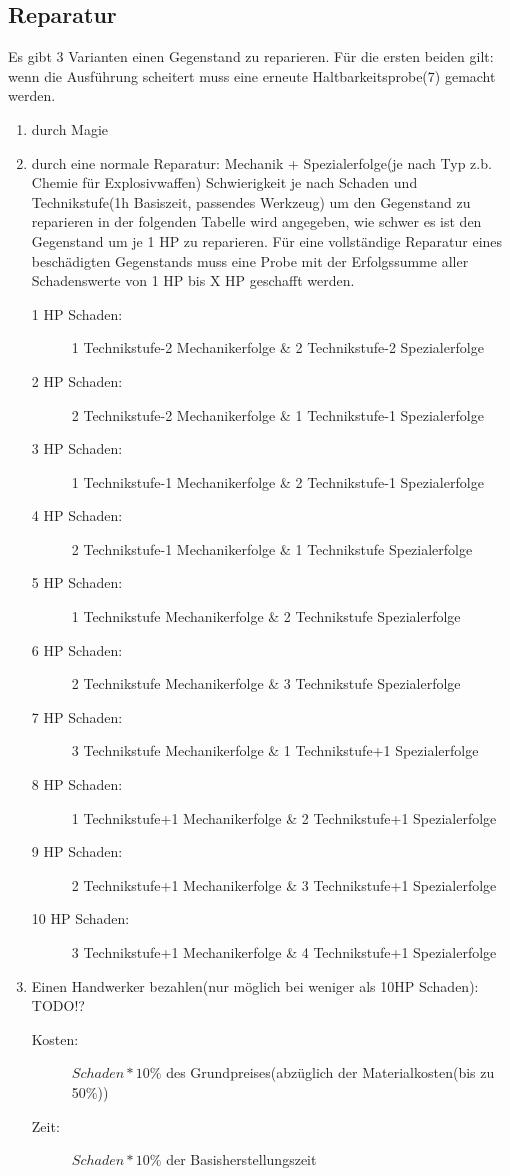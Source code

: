 \subsection{Reparatur}
Es gibt 3 Varianten einen Gegenstand zu reparieren. Für die ersten beiden gilt: wenn die Ausführung scheitert muss eine erneute Haltbarkeitsprobe(7) gemacht werden.\begin{enumerate}
\item durch Magie
\item \label{Reperatur} durch eine normale Reparatur: Mechanik + Spezialerfolge(je nach Typ z.b. Chemie für Explosivwaffen) Schwierigkeit je nach Schaden und Technikstufe(1h Basiszeit, passendes Werkzeug) um den Gegenstand zu reparieren in der folgenden Tabelle wird angegeben, wie schwer es ist den Gegenstand um je 1 HP zu reparieren. Für eine vollständige Reparatur eines beschädigten Gegenstands muss eine Probe mit der Erfolgssumme aller Schadenswerte von 1 HP bis X HP geschafft werden.

\begin{description}
\item[1 HP Schaden:] 1 Technikstufe-2 Mechanikerfolge \& 2 Technikstufe-2 Spezialerfolge
\item[2 HP Schaden:] 2 Technikstufe-2 Mechanikerfolge \& 1 Technikstufe-1 Spezialerfolge
\item[3 HP Schaden:] 1 Technikstufe-1 Mechanikerfolge \& 2 Technikstufe-1 Spezialerfolge
\item[4 HP Schaden:] 2 Technikstufe-1 Mechanikerfolge \& 1 Technikstufe Spezialerfolge
\item[5 HP Schaden:] 1 Technikstufe Mechanikerfolge \& 2 Technikstufe Spezialerfolge
\item[6 HP Schaden:] 2 Technikstufe Mechanikerfolge \& 3 Technikstufe Spezialerfolge
\item[7 HP Schaden:] 3 Technikstufe Mechanikerfolge \& 1 Technikstufe+1 Spezialerfolge
\item[8 HP Schaden:] 1 Technikstufe+1 Mechanikerfolge \& 2 Technikstufe+1 Spezialerfolge
\item[9 HP Schaden:] 2 Technikstufe+1 Mechanikerfolge \& 3 Technikstufe+1 Spezialerfolge
\item[10 HP Schaden:] 3 Technikstufe+1 Mechanikerfolge \& 4 Technikstufe+1 Spezialerfolge
\end{description}
\item Einen Handwerker bezahlen(nur möglich bei weniger als 10HP Schaden): TODO!?
\begin{description}
\item[Kosten:] $Schaden*10\%$ des Grundpreises(abzüglich der Materialkosten(bis zu 50\%))
\item[Zeit:] $Schaden*10\%$ der Basisherstellungszeit
\end{description}
\end{enumerate}

